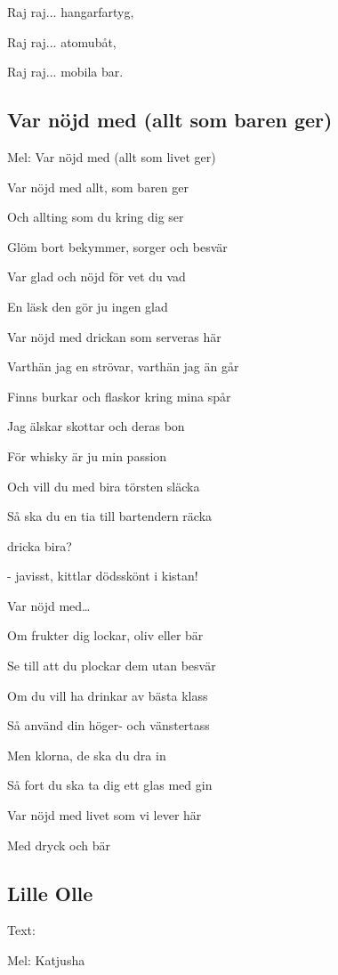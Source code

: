 Raj raj... hangarfartyg,\bigskip

Raj raj... atomubåt,\bigskip

Raj raj... mobila bar.\bigskip


\subsection{\textbf{Var nöjd med (allt som baren ger)}}

Mel:  Var nöjd med (allt som livet ger)\bigskip


Var nöjd med allt, som baren ger

Och allting som du kring dig ser

Glöm bort bekymmer, sorger och besvär

Var glad och nöjd för vet du vad

En läsk den gör ju ingen glad

Var nöjd med drickan som serveras här\bigskip

Varthän jag en strövar, varthän jag än går

Finns burkar och flaskor kring mina spår

Jag älskar skottar och deras bon

För whisky är ju min passion

Och vill du med bira törsten släcka

Så ska du en tia till bartendern räcka

dricka bira?

- javisst, kittlar dödsskönt i kistan!\bigskip

Var nöjd med…\bigskip

Om frukter dig lockar, oliv eller bär

Se till att du plockar dem utan besvär

Om du vill ha drinkar av bästa klass

Så använd din höger- och vänstertass

Men klorna, de ska du dra in

Så fort du ska ta dig ett glas med gin\bigskip

Var nöjd med livet som vi lever här

Med dryck och bär \bigskip

\subsection{\textbf{Lille Olle}}

Text: 

Mel: Katjusha\bigskip

